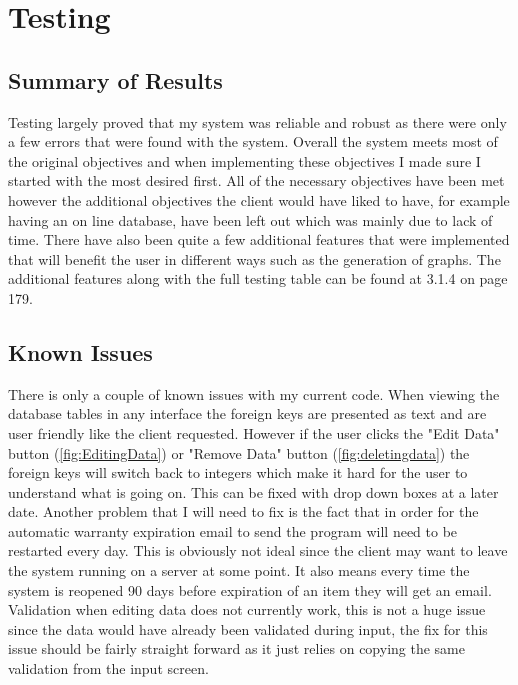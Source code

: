 \section{Testing}

\subsection{Summary of Results}

Testing largely proved that my system was reliable and robust as there were only a few errors that were found with the system. Overall the system meets most of the original objectives and when implementing these objectives I made sure I started with the most desired first. All of the necessary objectives have been met however the additional objectives the client would have liked to have, for example having an on line database, have been left out which was mainly due to lack of time. There have also been quite a few additional features that were implemented that will benefit the user in different ways such as the generation of graphs. The additional features along with the full testing table can be found at 3.1.4 on page 179.

\subsection{Known Issues}

There is only a couple of known issues with my current code. When viewing the database tables in any interface the foreign keys are presented as text and are user friendly like the client requested. However if the user clicks the "Edit Data" button (\ref{fig:EditingData}) or "Remove Data" button (\ref{fig:deletingdata}) the foreign keys will switch back to integers which make it hard for the user to understand what is going on. This can be fixed with drop down boxes at a later date. Another problem that I will need to fix is the fact that in order for the automatic warranty expiration email to send the program will need to be restarted every day. This is obviously not ideal since the client may want to leave the system running on a server at some point. It also means every time the system is reopened 90 days before expiration of an item they will get an email. Validation when editing data does not currently work, this is not a huge issue since the data would have already been validated during input, the fix for this issue should be fairly straight forward as it just relies on copying the same validation from the input screen.

